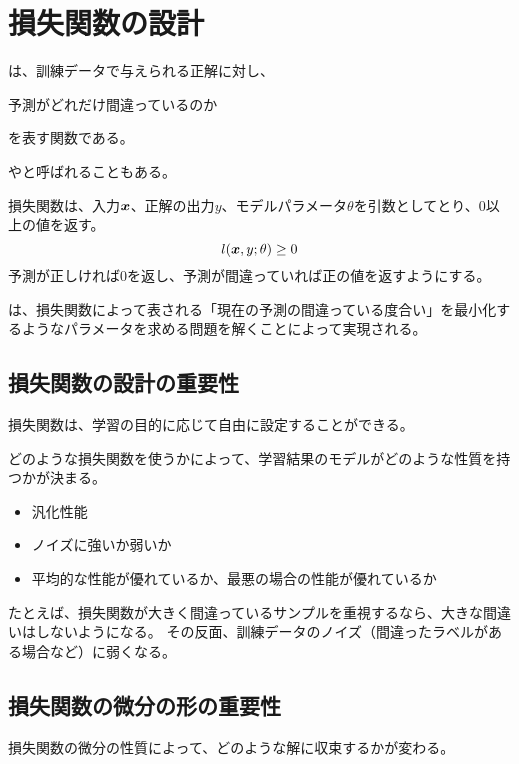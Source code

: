 \documentclass[../../../topic_machine-learning]{subfiles}
\begin{document}
\sectionline
\section{損失関数の設計}

は、訓練データで与えられる正解に対し、
\begin{emphabox}
  \begin{spacebox}
    \begin{center}
      予測がどれだけ間違っているのか
    \end{center}
  \end{spacebox}
\end{emphabox}
を表す関数である。

やと呼ばれることもある。

\br

損失関数は、入力$\vb*{x}$、正解の出力$y$、モデルパラメータ$\theta$を引数としてとり、0以上の値を返す。
\begin{equation*}
  l(\vb*{x}, y; \theta) \geq 0
\end{equation*}
予測が正しければ0を返し、予測が間違っていれば正の値を返すようにする。

\br

は、損失関数によって表される「現在の予測の間違っている度合い」を最小化するようなパラメータを求める問題を解くことによって実現される。

\subsection{損失関数の設計の重要性}

損失関数は、学習の目的に応じて自由に設定することができる。

\br

どのような損失関数を使うかによって、学習結果のモデルがどのような性質を持つかが決まる。

\begin{itemize}
  \item 汎化性能
  \item ノイズに強いか弱いか
  \item 平均的な性能が優れているか、最悪の場合の性能が優れているか
\end{itemize}

たとえば、損失関数が大きく間違っているサンプルを重視するなら、大きな間違いはしないようになる。
その反面、訓練データのノイズ（間違ったラベルがある場合など）に弱くなる。

\subsection{損失関数の微分の形の重要性}

損失関数の微分の性質によって、どのような解に収束するかが変わる。
\end{document}
